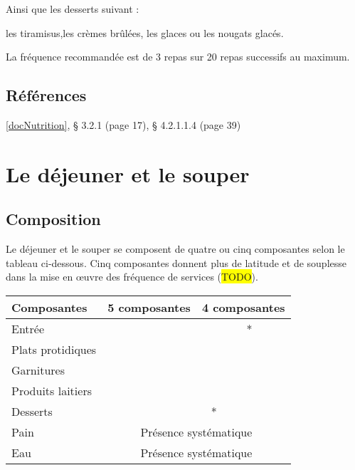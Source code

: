 Ainsi que les desserts suivant :

les tiramisus,les crèmes brûlées, les glaces ou les nougats glacés.

La fréquence recommandée est de 3 repas sur 20 repas successifs au maximum.

\subsection{Références}

\ref{docNutrition}, § 3.2.1 (page 17), § 4.2.1.1.4 (page 39)

\section{Le déjeuner et le souper}

\subsection{Composition}

Le déjeuner et le souper se composent de quatre ou cinq composantes selon le tableau ci-dessous. Cinq composantes donnent plus de latitude et de souplesse dans la mise en œuvre des fréquence de services (\colorbox{yellow}{TODO}).

\newcommand\Chbx{\centering{\CheckedBox}}

\begin{center}

\begin{tabular}{|l|c|c|c|c|}
	\hline
	\textbf{Composantes} & \textbf{5 composantes} & \multicolumn{3}{|c|}{\textbf{4 composantes}} \\
	\hline
	Entrée & \checkmark & \checkmark & \checkmark ** & \cellcolor{gray} \\
	\hline
	Plats protidiques & \checkmark & \checkmark & \checkmark & \checkmark \\
	\hline
	Garnitures & \checkmark & \checkmark & \checkmark & \checkmark \\
	\hline
	Produits laitiers & \checkmark & \cellcolor{gray} & \checkmark & \checkmark \\
	\hline
	Desserts & \checkmark & \checkmark ** & \checkmark & \checkmark \\
	\hline
	Pain & \multicolumn{4}{|c|}{Présence systématique} \\
	\hline
	Eau & \multicolumn{4}{|c|}{Présence systématique} \\
	\hline
\end{tabular}

\end{center}

